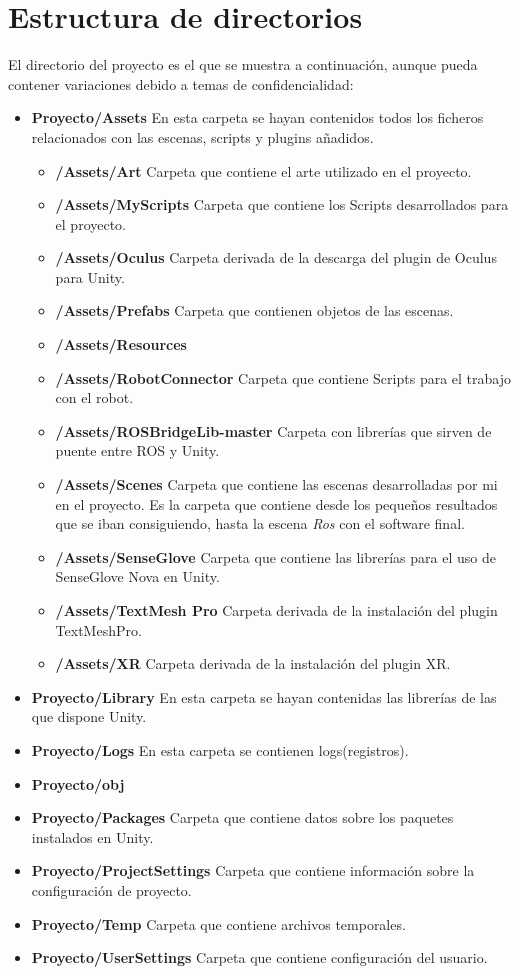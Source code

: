 \section{Estructura de directorios}
El directorio del proyecto es el que se muestra a continuación, aunque pueda contener variaciones debido a temas de confidencialidad:
\begin{itemize}
\item \textbf{Proyecto/Assets} En esta carpeta se hayan contenidos todos los ficheros relacionados con las escenas, scripts y plugins añadidos.	
\begin{itemize}
    \item \textbf{/Assets/Art} Carpeta que contiene el arte utilizado en el proyecto.
    \item \textbf{/Assets/MyScripts} Carpeta que contiene los Scripts desarrollados para el proyecto.
    \item \textbf{/Assets/Oculus} Carpeta derivada de la descarga del plugin de Oculus para Unity.
    \item \textbf{/Assets/Prefabs} Carpeta que contienen objetos de las escenas.
    \item \textbf{/Assets/Resources} 
    \item \textbf{/Assets/RobotConnector} Carpeta que contiene Scripts para el trabajo con el robot.
    \item \textbf{/Assets/ROSBridgeLib-master} Carpeta con librerías que sirven de puente entre ROS y Unity.
    \item \textbf{/Assets/Scenes} Carpeta que contiene las escenas desarrolladas por mi en el proyecto. Es la carpeta que contiene desde los pequeños resultados que se iban consiguiendo, hasta la escena \textit{Ros} con el software final.
    \item \textbf{/Assets/SenseGlove} Carpeta que contiene las librerías para el uso de SenseGlove Nova en Unity.
    \item \textbf{/Assets/TextMesh Pro} Carpeta derivada de la instalación del plugin TextMeshPro.
    \item \textbf{/Assets/XR} Carpeta derivada de la instalación del plugin XR.
    
\end{itemize}
\item\textbf{Proyecto/Library} En esta carpeta se hayan contenidas las librerías de las que dispone Unity.
\item\textbf{Proyecto/Logs} En esta carpeta se contienen logs(registros).
\item\textbf{Proyecto/obj} 
\item\textbf{Proyecto/Packages} Carpeta que contiene datos sobre los paquetes instalados en Unity.
\item\textbf{Proyecto/ProjectSettings} Carpeta que contiene información sobre la configuración de proyecto.
\item\textbf{Proyecto/Temp} Carpeta que contiene archivos temporales.
\item\textbf{Proyecto/UserSettings} Carpeta que contiene configuración del usuario.
\end{itemize}

